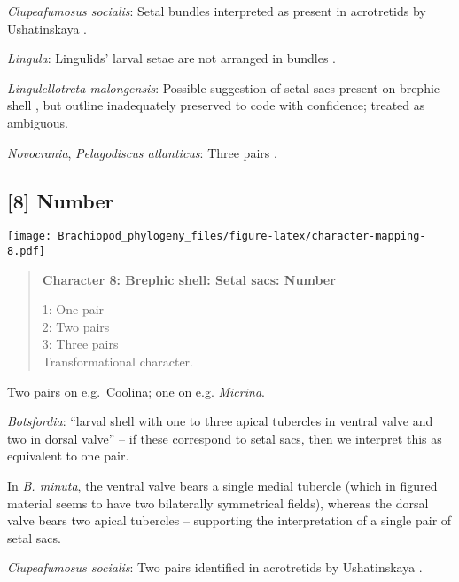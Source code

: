 \documentclass[openany]{book}
\theoremstyle{definition}
\theoremstyle{definition}
\theoremstyle{definition}
\theoremstyle{remark}
\begin{document}
\hypertarget{Clupeafumosus_socialis-coding-7}{}
\emph{Clupeafumosus socialis}: Setal bundles interpreted as present in
acrotretids by Ushatinskaya \citeyearpar{Ushatinskaya2016Protegulumand}.

\hypertarget{Lingula-coding-7}{}
\emph{Lingula}: Lingulids' larval setae are not arranged in bundles
\citep{Carlson1995Phylogeneticrelationships}.

\hypertarget{Lingulellotreta_malongensis-coding-7}{}
\emph{Lingulellotreta malongensis}: Possible suggestion of setal sacs
present on brephic shell \citep{Holmer1997EarlyCambrian, Li2004}, but
outline inadequately preserved to code with confidence; treated as
ambiguous.

\hypertarget{Novocrania-coding-7}{}
\emph{Novocrania}, \emph{Pelagodiscus atlanticus}: Three pairs
\citep{Carlson1995Phylogeneticrelationships}.

\subsection*{{[}8{]} Number}\label{number}

\texttt{[image: Brachiopod\_phylogeny\_files/figure-latex/character-mapping-8.pdf]}

\begin{quote}
\textbf{Character 8: Brephic shell: Setal sacs: Number}

1: One pair\\
2: Two pairs\\
3: Three pairs\\
Transformational character.
\end{quote}

Two pairs on e.g.~Coolina; one on e.g. \emph{Micrina}.

\hypertarget{Botsfordia-coding-8}{}
\emph{Botsfordia}: ``larval shell with one to three apical tubercles in
ventral valve and two in dorsal valve''
\citep{Williams2000LinguliformeaCraniiformea} -- if these correspond to
setal sacs, then we interpret this as equivalent to one pair.

In \emph{B. minuta}, the ventral valve bears a single medial tubercle
(which in figured material seems to have two bilaterally symmetrical
fields), whereas the dorsal valve bears two apical tubercles
\citep{Li2004} -- supporting the interpretation of a single pair of
setal sacs.

\hypertarget{Clupeafumosus_socialis-coding-8}{}
\emph{Clupeafumosus socialis}: Two pairs identified in acrotretids by
Ushatinskaya \citeyearpar{Ushatinskaya2016Protegulumand}.
\end{document}

